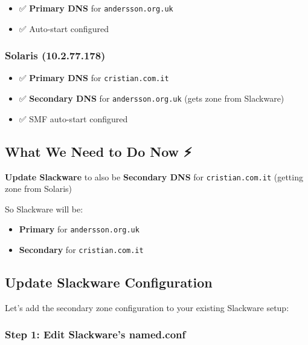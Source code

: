 \begin{itemize}
\tightlist
\item
  ✅ \textbf{Primary DNS} for \texttt{andersson.org.uk}
\item
  ✅ Auto-start configured
\end{itemize}

\subsubsection{\texorpdfstring{\textbf{Solaris
(10.2.77.178)}}{Solaris (10.2.77.178)}}\label{solaris-10.2.77.178}

\begin{itemize}
\tightlist
\item
  ✅ \textbf{Primary DNS} for \texttt{cristian.com.it}
\item
  ✅ \textbf{Secondary DNS} for \texttt{andersson.org.uk} (gets zone
  from Slackware)
\item
  ✅ SMF auto-start configured
\end{itemize}

\subsection{What We Need to Do Now ⚡}\label{what-we-need-to-do-now}

\textbf{Update Slackware} to also be \textbf{Secondary DNS} for
\texttt{cristian.com.it} (getting zone from Solaris)

So Slackware will be:

\begin{itemize}
\tightlist
\item
  \textbf{Primary} for \texttt{andersson.org.uk}
\item
  \textbf{Secondary} for \texttt{cristian.com.it}
\end{itemize}

\subsection{Update Slackware
Configuration}\label{update-slackware-configuration}

Let's add the secondary zone configuration to your existing Slackware
setup:

\subsubsection{Step 1: Edit Slackware's
named.conf}\label{step-1-edit-slackwares-named.conf}

